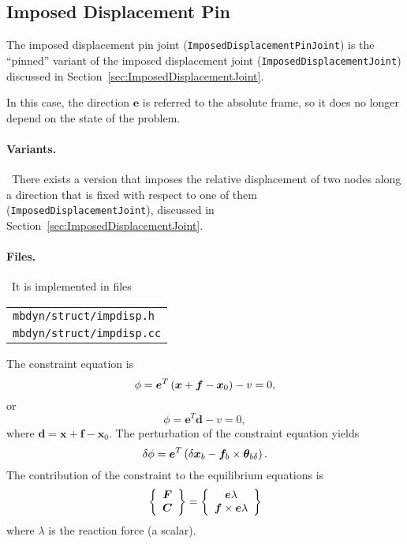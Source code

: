 \documentclass[10pt,dvips,fleqn,subeqn]{report}
\newcommand{\T}[1]{\bm{#1}}
\begin{document}
\subsection{Imposed Displacement Pin}
\label{sec:ImposedDisplacementPinJoint}
The imposed displacement pin joint (\texttt{ImposedDisplacementPinJoint}) 
is the ``pinned'' variant of the imposed displacement joint
(\texttt{ImposedDisplacementJoint}) discussed
in Section~\ref{sec:ImposedDisplacementJoint}.

In this case, the direction $\T{e}$ is referred to the absolute frame,
so it does no longer depend on the state of the problem.

\paragraph{Variants.} \
There exists a version that imposes the relative displacement of two nodes
along a direction that is fixed with respect to one of them 
(\texttt{ImposedDisplacementJoint}),
discussed in Section~\ref{sec:ImposedDisplacementJoint}.

\paragraph{Files.} \
It is implemented in files

\begin{tabular}{l}
\texttt{mbdyn/struct/impdisp.h} \\
\texttt{mbdyn/struct/impdisp.cc}
\end{tabular}

The constraint equation is
\begin{equation}
	\phi = \T{e}^T \plbr{\T{x} + \T{f} - \T{x}_0} - v = 0 ,
\end{equation}
or
\begin{equation}
	\phi = \T{e}^T \T{d} - v = 0 ,
\end{equation}
where $\T{d}=\T{x} + \T{f} - \T{x}_0$.
The perturbation of the constraint equation yields
\begin{equation}
	\delta\phi = 
		\T{e}^T \plbr{\delta\T{x}_b
		- \T{f}_b\times\T{\theta}_{b\delta}
		} .
\end{equation}
The contribution of the constraint to the equilibrium equations is
\begin{equation}
	\cubr{\cvvect{
		\T{F} \\
		\T{C}
	}} = \cubr{\cvvect{
		\T{e} \lambda \\
		\T{f} \times \T{e} \lambda
	}}
\end{equation}
where $\lambda$ is the reaction force (a scalar).
\end{document}
